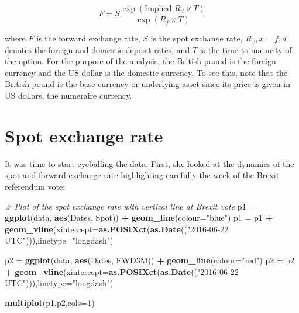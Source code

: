 \documentclass[]{book}
\newenvironment{Shaded}{\begin{snugshade}}{\end{snugshade}}
\newcommand{\KeywordTok}[1]{\textcolor[rgb]{0.13,0.29,0.53}{\textbf{#1}}}
\newcommand{\DataTypeTok}[1]{\textcolor[rgb]{0.13,0.29,0.53}{#1}}
\newcommand{\DecValTok}[1]{\textcolor[rgb]{0.00,0.00,0.81}{#1}}
\newcommand{\StringTok}[1]{\textcolor[rgb]{0.31,0.60,0.02}{#1}}
\newcommand{\CommentTok}[1]{\textcolor[rgb]{0.56,0.35,0.01}{\textit{#1}}}
\newcommand{\OperatorTok}[1]{\textcolor[rgb]{0.81,0.36,0.00}{\textbf{#1}}}
\newcommand{\NormalTok}[1]{#1}
\theoremstyle{definition}
\theoremstyle{definition}
\theoremstyle{definition}
\theoremstyle{remark}
\begin{document}
\[ F = S \frac{\exp \left(\text{Implied } R_d \times T\right)}{\exp \left(R_f \times T\right)} \]

where \(F\) is the forward exchange rate, \(S\) is the spot exchange
rate, \(R_x, x= f, d\) denotes the foreign and domestic deposit rates,
and \(T\) is the time to maturity of the option. For the purpose of the
analysis, the British pound is the foreign currency and the US dollar is
the domestic currency. To see this, note that the British pound is the
base currency or underlying asset since its price is given in US
dollars, the numeraire currency.

\section{Spot exchange rate}\label{spot-exchange-rate}

It was time to start eyeballing the data. First, she looked at the
dynamics of the spot and forward exchange rate highlighting carefully
the week of the Brexit referendum vote:

\begin{Shaded}
\begin{Highlighting}[]
\CommentTok{# Plot of the spot exchange rate with vertical line at Brexit vote}
\NormalTok{p1 =}\StringTok{ }\KeywordTok{ggplot}\NormalTok{(data, }\KeywordTok{aes}\NormalTok{(Dates, Spot)) }\OperatorTok{+}\StringTok{ }\KeywordTok{geom_line}\NormalTok{(}\DataTypeTok{colour=}\StringTok{"blue"}\NormalTok{) }
\NormalTok{p1 =}\StringTok{ }\NormalTok{p1 }\OperatorTok{+}\StringTok{ }\KeywordTok{geom_vline}\NormalTok{(}\DataTypeTok{xintercept=}\KeywordTok{as.POSIXct}\NormalTok{(}\KeywordTok{as.Date}\NormalTok{((}\StringTok{"2016-06-22 UTC"}\NormalTok{))),}\DataTypeTok{linetype=}\StringTok{"longdash"}\NormalTok{)}

\NormalTok{p2 =}\StringTok{ }\KeywordTok{ggplot}\NormalTok{(data, }\KeywordTok{aes}\NormalTok{(Dates, FWD3M)) }\OperatorTok{+}\StringTok{ }\KeywordTok{geom_line}\NormalTok{(}\DataTypeTok{colour=}\StringTok{"red"}\NormalTok{) }
\NormalTok{p2 =}\StringTok{ }\NormalTok{p2 }\OperatorTok{+}\StringTok{ }\KeywordTok{geom_vline}\NormalTok{(}\DataTypeTok{xintercept=}\KeywordTok{as.POSIXct}\NormalTok{(}\KeywordTok{as.Date}\NormalTok{((}\StringTok{"2016-06-22 UTC"}\NormalTok{))),}\DataTypeTok{linetype=}\StringTok{"longdash"}\NormalTok{)}

\KeywordTok{multiplot}\NormalTok{(p1,p2,}\DataTypeTok{cols=}\DecValTok{1}\NormalTok{)}
\end{Highlighting}
\end{Shaded}
\end{document}
